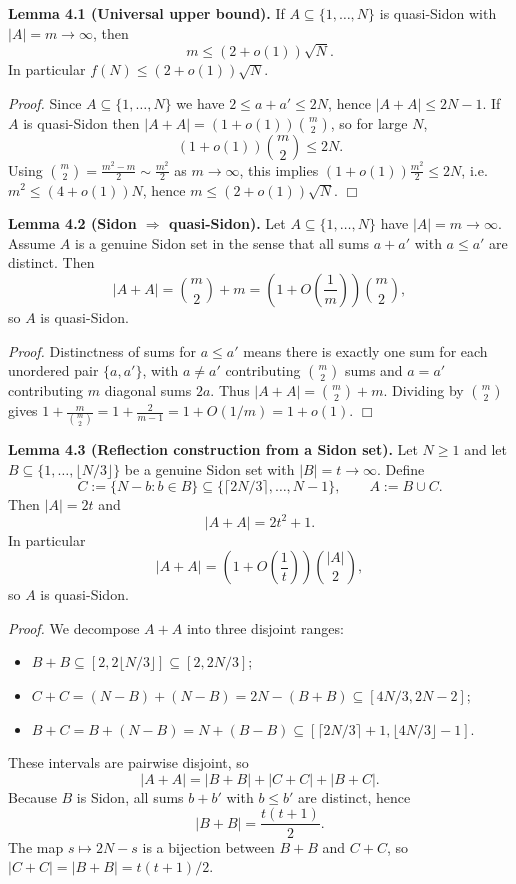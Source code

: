 \medskip
\noindent\textbf{Lemma 4.1 (Universal upper bound).}
If $A\subseteq\{1,\dots,N\}$ is quasi-Sidon with $|A|=m\to\infty$, then
\[
m\le (2+o(1))\sqrt N.
\]
In particular $f(N)\le (2+o(1))\sqrt N$.

\noindent\emph{Proof.}
Since $A\subseteq\{1,\dots,N\}$ we have $2\le a+a'\le 2N$, hence $|A+A|\le 2N-1$.
If $A$ is quasi-Sidon then $|A+A|=(1+o(1))\binom{m}{2}$, so for large $N$,
\[
(1+o(1))\binom{m}{2} \le 2N.
\]
Using $\binom{m}{2}=\frac{m^2-m}{2}\sim \frac{m^2}{2}$ as $m\to\infty$, this implies
$(1+o(1))\frac{m^2}{2}\le 2N$, i.e. $m^2\le (4+o(1))N$, hence $m\le (2+o(1))\sqrt N$.
\hfill$\Box$

\medskip
\noindent\textbf{Lemma 4.2 (Sidon $\Rightarrow$ quasi-Sidon).}
Let $A\subseteq\{1,\dots,N\}$ have $|A|=m\to\infty$.
Assume $A$ is a genuine Sidon set in the sense that all sums $a+a'$ with $a\le a'$ are distinct.
Then
\[
|A+A| = \binom{m}{2}+m = \left(1+O\left(\frac{1}{m}\right)\right)\binom{m}{2},
\]
so $A$ is quasi-Sidon.

\noindent\emph{Proof.}
Distinctness of sums for $a\le a'$ means there is exactly one sum for each unordered pair $\{a,a'\}$, with $a\ne a'$ contributing $\binom{m}{2}$ sums and $a=a'$ contributing $m$ diagonal sums $2a$.
Thus $|A+A|=\binom{m}{2}+m$.
Dividing by $\binom{m}{2}$ gives $1+\frac{m}{\binom{m}{2}}=1+\frac{2}{m-1}=1+O(1/m)=1+o(1)$.
\hfill$\Box$

\medskip
\noindent\textbf{Lemma 4.3 (Reflection construction from a Sidon set).}
Let $N\ge 1$ and let $B\subseteq\{1,\dots,\lfloor N/3\rfloor\}$ be a genuine Sidon set with $|B|=t\to\infty$.
Define
\[
C:=\{N-b: b\in B\}\subseteq\{\lceil 2N/3\rceil,\dots,N-1\},
\qquad A:=B\cup C.
\]
Then $|A|=2t$ and
\[
|A+A| = 2t^2+1.
\]
In particular
\[
|A+A| = \left(1+O\left(\frac{1}{t}\right)\right)\binom{|A|}{2},
\]
so $A$ is quasi-Sidon.

\noindenti\emph{Proof.}
We decompose $A+A$ into three disjoint ranges:
\begin{itemize}
\item $B+B \subseteq [2,2\lfloor N/3\rfloor] \subseteq [2,2N/3]$;
\item $C+C = (N-B)+(N-B)=2N-(B+B) \subseteq [4N/3,2N-2]$;
\item $B+C = B+(N-B)=N+(B-B) \subseteq [\lceil 2N/3\rceil+1, \lfloor 4N/3\rfloor-1]$.
\end{itemize}
These intervals are pairwise disjoint, so
\[
|A+A| = |B+B| + |C+C| + |B+C|.
\]
Because $B$ is Sidon, all sums $b+b'$ with $b\le b'$ are distinct, hence
\[
|B+B|=\frac{t(t+1)}{2}.
\]
The map $s\mapsto 2N-s$ is a bijection between $B+B$ and $C+C$, so $|C+C|=|B+B|=t(t+1)/2$.


